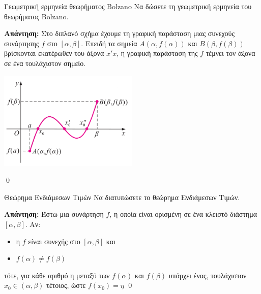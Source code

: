 \documentclass[a4paper, 12pt]{article}
\renewenvironment{proof}[1][\textbf{Απάντηση}]{%
  \par\noindent\textbf{#1:} \rmfamily}{\qed\par}
\begin{document}
\begin{theorem}{Γεωμετρική ερμηνεία θεωρήματος Bolzano }
  Να δώσετε τη γεωμετρική ερμηνεία του θεωρήματος Bolzano.
\end{theorem}
\begin{proof}
  Στο διπλανό σχήμα έχουμε τη γραφική παράσταση μιας συνεχούς συνάρτησης $f$ στο $[α, β]$. Επειδή τα σημεία $Α(α, f(α))$ και $Β(β, f(β))$ βρίσκονται εκατέρωθεν του άξονα $x′x$, η γραφική παράσταση της $f$ τέμνει τον άξονα σε ένα τουλάχιστον σημείο.
  \begin{center}
    \includegraphics[width=0.5\textwidth]{images/geoBolzano}
  \end{center}
\end{proof}

\begin{theorem}{Θεώρημα Ενδιάμεσων Τιμών}
  Να διατυπώσετε το θεώρημα Ενδιάμεσων Τιμών.
\end{theorem}
\begin{proof}
  Έστω μια συνάρτηση $f$, η οποία είναι ορισμένη σε ένα κλειστό διάστημα $[α, β]$. Αν:
  \begin{itemize}
    \item η $f$ είναι συνεχής στο $[α, β]$ και
    \item $f(α) \neq f(β)$
  \end{itemize}
  τότε, για κάθε αριθμό η μεταξύ των $f(α)$ και $f(β)$ υπάρχει ένας, τουλάχιστον
  $x_0 \in (α , β )$ τέτοιος, ώστε
  $f(x_0) = η$
\end{proof}
\end{document}
